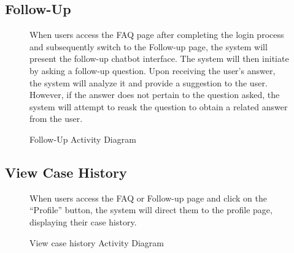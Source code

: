 \documentclass[12pt,oneside,openright,a4paper]{cpe-english-project}
\begin{document}
      \subsection{Follow-Up}
      \begin{figure}[!h]
        \centering
        \caption{Follow-Up Activity Diagram}\label{fig:AD_Follow}
        \begin{flushleft}
          \qquad When users access the FAQ page after completing the login process and subsequently switch to the Follow-up page, the system will present the follow-up chatbot interface. The system will then initiate by asking a follow-up question. Upon receiving the user’s answer, the system will analyze it and provide a suggestion to the user. However, if the answer does not pertain to the question asked, the system will attempt to reask the question to obtain a related answer from the user.   \par
        \end{flushleft}
      \end{figure}
\newpage
      \subsection{View Case History}
      \begin{figure}[!h]
        \centering
        \caption{View case history Activity Diagram}\label{fig:AD_ViewCase}
        \begin{flushleft}
          \qquad When users access the FAQ or Follow-up page and click on the “Profile” button, the system will direct them to the profile page, displaying their case history.  \par
        \end{flushleft}
      \end{figure}
\newpage
\end{document}
